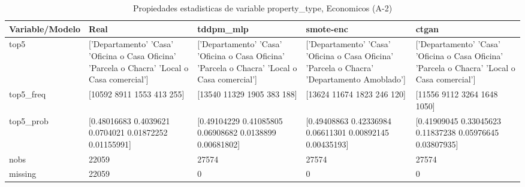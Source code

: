 \begin{table}[H]
\centering
\fontsize{8}{14}\selectfont
\caption{Propiedades  estadisticas de variable property\_type, Economicos (A-2)}
\label{table-stats-economicos-a-2-property_type}
\begin{tabular}{|l|m{10em}|m{10em}|m{10em}|m{10em}|}
\hline
 \rowcolor[gray]{0.8}
Variable/Modelo & Real & tddpm\_mlp & smote-enc & ctgan \\
\hline top5 & ['Departamento' 'Casa' 'Oficina o Casa Oficina' 'Parcela o Chacra'
 'Local o Casa comercial'] & ['Departamento' 'Casa' 'Oficina o Casa Oficina' 'Parcela o Chacra'
 'Local o Casa comercial'] & ['Departamento' 'Casa' 'Oficina o Casa Oficina' 'Parcela o Chacra'
 'Departamento Amoblado'] & ['Departamento' 'Casa' 'Oficina o Casa Oficina' 'Parcela o Chacra'
 'Local o Casa comercial'] \\
\hline top5\_freq & [10592  8911  1553   413   255] & [13540 11329  1905   383   188] & [13624 11674  1823   246   120] & [11556  9112  3264  1648  1050] \\
\hline top5\_prob & [0.48016683 0.4039621  0.0704021  0.01872252 0.01155991] & [0.49104229 0.41085805 0.06908682 0.0138899  0.00681802] & [0.49408863 0.42336984 0.06611301 0.00892145 0.00435193] & [0.41909045 0.33045623 0.11837238 0.05976645 0.03807935] \\
\hline nobs & 22059 & 27574 & 27574 & 27574 \\
\hline missing & 22059 & 0 & 0 & 0 \\
\hline
\end{tabular}
\end{table}
